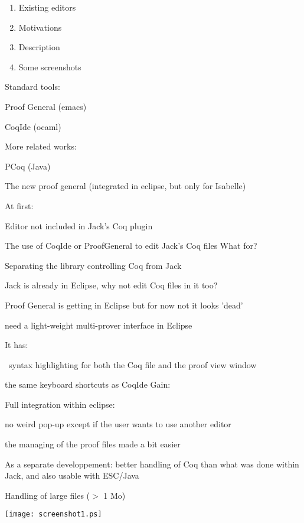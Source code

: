 \begin{enumerate}
  \item Existing editors
  \item Motivations
  \item Description
  \item Some screenshots

\end{enumerate}


\blist 
\item Standard tools:
  \blist \small
     \item Proof General (emacs)
     \item CoqIde (ocaml)
  \elist
\item More related works:
  \blist \small
     \item PCoq (Java)
     \item The new proof general (integrated in eclipse, but only for Isabelle)
  \elist
\elist

\small
At first:
\blist
\item Editor not included in Jack's Coq plugin
\item The use of {\purple CoqIde} or {\purple ProofGeneral} to edit Jack's Coq files
\elist
What for?
\blist
  \item Separating the {\purple library controlling Coq} from Jack
  \item Jack is already in Eclipse, why not edit Coq files in it too?
  \item Proof General is getting in Eclipse but for now not it looks 'dead'
  \item need a light-weight multi-prover interface in Eclipse
\elist



\small
It has:
\blist 
\item \ {\purple syntax highlighting}
 for both the Coq file and the proof view window
\item the same keyboard shortcuts as CoqIde
\elist
Gain:
\blist
\item Full integration within eclipse: 
  \blist 
  \item no weird pop-up except if the user wants to use another editor
  \item the managing of the proof files made a bit easier
  \elist
  
\item As a separate developpement: better handling of Coq than 
  what was done within Jack, and also usable with ESC/Java
\item Handling of {\purple large} files ($>$ 1 Mo)
\elist

\begin{center}
\texttt{[image: screenshot1.ps]}
\end{center}